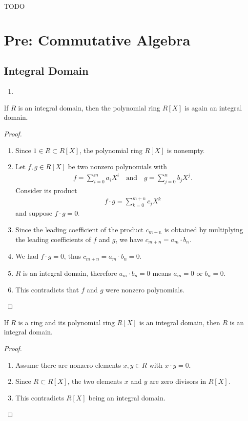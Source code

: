 TODO

\part{Pre: Commutative Algebra}
\chapter{Integral Domain}
\begin{enumerate}
    \item 
\end{enumerate}
\begin{proposition}
    If \(R\) is an integral domain, then the polynomial ring \(R[X]\) is again an integral domain.
\end{proposition}
\begin{proof}
    \begin{enumerate}
        \item Since \(1 \in R \subset R[X]\), the polynomial ring \(R[X]\) is nonempty.
        \item Let \(f, g \in R[X]\) be two nonzero polynomials with
        \begin{align*}
            f = \sum_{i = 0}^{m} a_i X^i \quad \text{and} \quad g = \sum_{j = 0}^{n} b_j X^j \text{.}
        \end{align*}
        Consider its product
        \begin{align*}
            f \cdot g = \sum_{k = 0}^{m + n} c_j X^k
        \end{align*}
        and suppose \(f \cdot g = 0\).
        \item Since the leading coefficient of the product \(c_{m+n}\) is obtained by multiplying the leading coefficients of \(f\) and \(g\), we have \(c_{m+n} = a_m \cdot b_n\).
        \item We had \(f \cdot g = 0\), thus \(c_{m+n} = a_m \cdot b_n = 0\).
        \item \(R\) is an integral domain, therefore \(a_m \cdot b_n = 0\) means \(a_m = 0\) or \(b_n = 0\).
        \item This contradicts that \(f\) and \(g\) were nonzero polynomials.
    \end{enumerate}
\end{proof}

\begin{proposition}
    If \(R\) is a ring and its polynomial ring \(R[X]\) is an integral domain, then \(R\) is an integral domain.
\end{proposition}
\begin{proof}
    \begin{enumerate}
        \item Assume there are nonzero elements \(x, y \in R\) with \(x \cdot y = 0\).
        \item Since \(R \subset R[X]\), the two elements \(x\) and \(y\) are zero divisors in \(R[X]\).
        \item This contradicts \(R[X]\) being an integral domain.
    \end{enumerate}
\end{proof}

